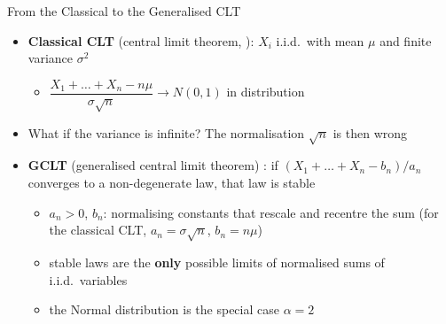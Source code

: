 \begin{frame}{From the Classical to the Generalised CLT}
\itemsize{\small}
\begin{itemize}
    \item \textbf{Classical CLT} (central limit theorem, ): $X_i$ i.i.d.\ with mean $\mu$ and finite variance $\sigma^2$
    \begin{itemize}
        \item $\dfrac{X_1 + \dots + X_n - n\mu}{\sigma\sqrt{n}} \to N(0, 1)$ in distribution
    \end{itemize}
    \item What if the variance is infinite? The normalisation $\sqrt{n}$ is then wrong
    \item \textbf{GCLT} (generalised central limit theorem) : if $(X_1 + \dots + X_n - b_n)/a_n$ converges to a non-degenerate law, that law is stable
    \begin{itemize}
        \item $a_n > 0$, $b_n$: normalising constants that rescale and recentre the sum (for the classical CLT, $a_n = \sigma\sqrt{n}$, $b_n = n\mu$)
        \item stable laws are the \textbf{only} possible limits of normalised sums of i.i.d.\ variables
        \item the Normal distribution is the special case $\alpha = 2$
    \end{itemize}
\end{itemize}
\end{frame}

